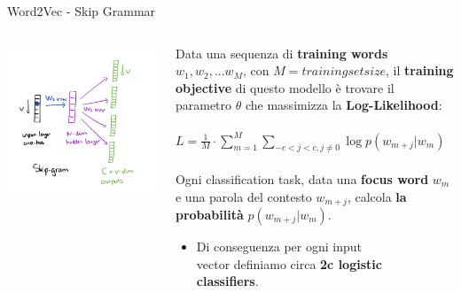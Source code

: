 \documentclass[british]{beamer}
\begin{document}
\begin{frame}{Word2Vec - Skip Grammar}
	\begin{columns}
		\begin{column}{0.4\textwidth}
			\includegraphics[width=1.1\linewidth,height=1.4\textwidth]{./Imgs/skip.png}
		\end{column}
		\begin{column}{0.6\textwidth}
			Data una sequenza di \textbf{training words} \(w_1, w_2, ... w_M\), con \(M = trainingsetsize\), il \textbf{training objective} di questo modello \`{e} trovare il parametro \(\theta\) che massimizza la \textbf{Log-Likelihood}:
			\\~\\
			\(L =	\frac{1}{M}\cdot\sum_{m=1}^{M}\sum_{-c<j<c,j\neq0}\log p(w_{m+j}|w_{m})\)
			\\~\\
			Ogni classification task, data una \textbf{focus word} \(w_m\) e una parola del contesto \(w_{m+j}\), calcola \textbf{la probabilit\`{a}} \(p(w_{m+j}|w_{m})\).
			\begin{itemize}
				\item Di conseguenza per ogni input \\vector definiamo circa \textbf{2c logistic\\ classifiers}.
			\end{itemize}
		\end{column}
	\end{columns}
\end{frame}
\end{document}
